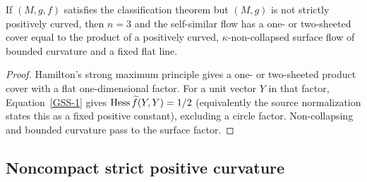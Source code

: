 \begin{claim}\label{claim:non-strictly-positive-curvature-splitting}
\label{flatssplit}

If $(M,g,f)$ satisfies the classification theorem but $(M,g)$ is not
strictly positively curved, then $n=3$ and the self-similar flow has
a one- or two-sheeted cover equal to the product of a positively
curved, $\kappa$-non-collapsed surface flow of bounded curvature and
a fixed flat line.
\end{claim}
\begin{proof}
\sketch Hamilton's strong maximum principle gives a one- or
two-sheeted product cover with a flat one-dimensional factor. For a
unit vector $Y$ in that factor, Equation~\ref{GSS-1} gives
$\operatorname{Hess}\widetilde f(Y,Y)=1/2$ (equivalently the source normalization
states this as a fixed positive constant), excluding a circle
factor. Non-collapsing and bounded curvature pass to the surface
factor.
\end{proof}

\subsection{Noncompact strict positive curvature}\label{noncomp}

